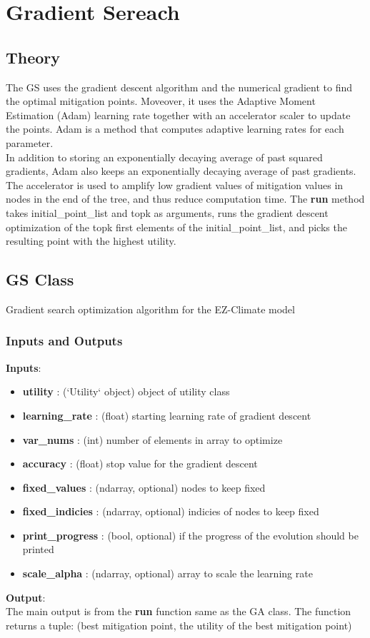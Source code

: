 \documentclass[12pt]{article}
\begin{document}
\section{Gradient Sereach}

\subsection{Theory}
The GS uses the gradient descent algorithm and the numerical gradient to find the optimal mitigation points. Moveover, it uses the Adaptive Moment Estimation (Adam) learning rate together with an accelerator scaler to update the points. Adam is a method that computes adaptive learning rates for each parameter.\\
In addition to storing an exponentially decaying average of past squared gradients, Adam also keeps an exponentially decaying average of past gradients. The accelerator is used to amplify low gradient values of mitigation values in nodes in the end of the tree, and thus reduce computation time. The \textbf{run} method takes initial\_point\_list and topk as arguments, runs the gradient descent optimization of the topk first elements of the initial\_point\_list, and picks the resulting point with the highest utility.

\subsection{GS Class}
Gradient search optimization algorithm for the EZ-Climate model
\subsubsection{Inputs and Outputs}
\textbf{Inputs}:
\begin{itemize}
  \item 	\textbf{utility} : (`Utility` object)
		object of utility class
  \item 	\textbf{learning\_rate} : (float)
		starting learning rate of gradient descent
  \item 	\textbf{var\_nums} : (int)
		number of elements in array to optimize
  \item 	\textbf{accuracy} : (float)
		stop value for the gradient descent
  \item 	\textbf{fixed\_values} : (ndarray, optional)
		nodes to keep fixed
  \item 	\textbf{fixed\_indicies} : (ndarray, optional)
		indicies of nodes to keep fixed
  \item 	\textbf{print\_progress} : (bool, optional)
		if the progress of the evolution should be printed
  \item 	\textbf{scale\_alpha} : (ndarray, optional)
		array to scale the learning rate
\end{itemize}
\textbf{Output}:\\
The main output is from the \textbf{run} function same as the GA class. The function returns a tuple: (best mitigation point, the utility of the best mitigation point)
\end{document}
